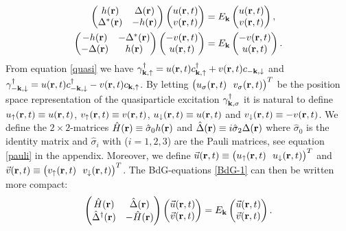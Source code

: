 \begin{equation}
\begin{split}
    \begin{pmatrix}
        h(\mathbf{r}) & \Delta(\mathbf{r}) \\
        \Delta^*(\mathbf{r}) & -h(\mathbf{r})
    \end{pmatrix}
    \begin{pmatrix}
        u(\mathbf{r},t) \\ v(\mathbf{r},t)
    \end{pmatrix}
    &=E_{\mathbf{k}}
    \begin{pmatrix}
        u(\mathbf{r},t) \\ v(\mathbf{r},t)
    \end{pmatrix},
    \\
    \begin{pmatrix}
        -h(\mathbf{r}) & -\Delta^*(\mathbf{r}) \\
        -\Delta(\mathbf{r}) & h(\mathbf{r})
    \end{pmatrix}
    \begin{pmatrix}
        -v(\mathbf{r},t) \\ u(\mathbf{r},t)
    \end{pmatrix}
    &=E_{\mathbf{k}}
    \begin{pmatrix}
        -v(\mathbf{r},t) \\ u(\mathbf{r},t)
    \end{pmatrix}.
\end{split}
\label{BdG-1}
\end{equation}
From equation \eqref{quasi} we have $\gamma_{\bf{k},\uparrow}^{\dagger} = u(\mathbf{r},t)c_{\bf{k},\uparrow}^{\dagger} + v(\mathbf{r},t)c_{-\bf{k},\downarrow}$ and $\gamma_{-\bf{k},\downarrow}^{\dagger} = u(\mathbf{r},t)c_{-\bf{k},\downarrow}^{\dagger} - v(\mathbf{r},t)c_{\bf{k},\uparrow}$. By letting $\big( u_{\sigma}(\mathbf{r},t) \ \ v_{\sigma}(\mathbf{r},t) \big)^{T}$ be the position space representation of the quasiparticle excitation $\gamma_{\bf{k},\sigma}^{\dagger}$ it is natural to define $u_{\uparrow}(\mathbf{r},t) \equiv u(\mathbf{r},t)$, $v_{\uparrow}(\mathbf{r},t) \equiv v(\mathbf{r},t)$, $u_{\downarrow}(\mathbf{r},t) \equiv u(\mathbf{r},t)$ and $v_{\downarrow}(\mathbf{r},t) \equiv -v(\mathbf{r},t)$. We define the $2\times 2$-matrices $\hat{H}(\mathbf{r}) \equiv \hat{\sigma}_0 h(\mathbf{r})$ and $\hat{\Delta}(\mathbf{r}) \equiv i \hat{\sigma}_2\Delta(\mathbf{r})$ where $\hat{\sigma}_0$ is the identity matrix and $\hat{\sigma}_i$ with ($i = 1,2,3$) are the Pauli matrices, see equation \eqref{pauli} in the appendix. Moreover, we define $\vec{u}(\rbf,t) \equiv \big(u_{\uparrow}(\rbf,t) \ \ u_{\downarrow}(\rbf,t)\big)^T$ and $\vec{v}(\rbf,t) \equiv \big(v_{\uparrow}(\rbf,t) \ \ v_{\downarrow}(\rbf,t)\big)^T$. The BdG-equations \eqref{BdG-1} can then be written more compact:
\begin{equation}
    \begin{pmatrix}
        \hat{H}(\mathbf{r}) & \hat{\Delta}(\mathbf{r}) \\
        \hat{\Delta}^{\dagger}(\mathbf{r}) & -\hat{H}(\mathbf{r})
    \end{pmatrix}
    \begin{pmatrix}
        \vec{u}(\mathbf{r},t) \\ \vec{v}(\mathbf{r},t)
    \end{pmatrix}
    =E_{\mathbf{k}}
    \begin{pmatrix}
        \vec{u}(\mathbf{r},t) \\ \vec{v}(\mathbf{r},t)
    \end{pmatrix}.
\label{BdG-2}
\end{equation}
